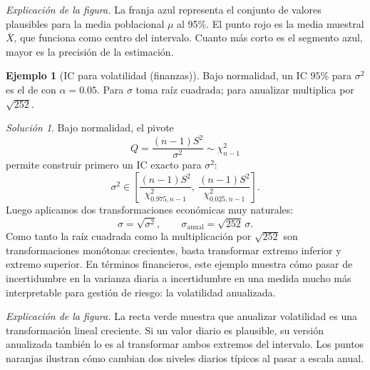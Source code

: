 \documentclass[11pt]{article}
\theoremstyle{plain}
\theoremstyle{definition}
\newtheorem{example}[theorem]{Ejemplo}
\theoremstyle{remark}
\theoremstyle{solstyle}
\newtheorem*{solution}{Solución}
\newcommand{\1}{\mathbbm{1}}
\begin{document}
\noindent\textit{Explicación de la figura.} La franja azul representa el conjunto de valores plausibles para la media poblacional $\mu$ al 95\%. El punto rojo es la media muestral $\overline X$, que funciona como centro del intervalo. Cuanto más corto es el segmento azul, mayor es la precisión de la estimación.

\begin{example}[IC para volatilidad (finanzas)]
Bajo normalidad, un IC $95\%$ para $\sigma^2$ es el de  con $\alpha=0.05$.
Para $\sigma$ toma raíz cuadrada; para anualizar multiplica por $\sqrt{252}$.
\end{example}

\begin{solution}
Bajo normalidad, el pivote
\[
Q=\frac{(n-1)S^2}{\sigma^2}\sim \chi^2_{n-1}
\]
permite construir primero un IC exacto para $\sigma^2$:
\[
\sigma^2\in \left[\frac{(n-1)S^2}{\chi^2_{0.975,n-1}},\ \frac{(n-1)S^2}{\chi^2_{0.025,n-1}}\right].
\]
Luego aplicamos dos transformaciones económicas muy naturales:
\[
\sigma=\sqrt{\sigma^2},
\qquad
\sigma_{\text{anual}}=\sqrt{252}\,\sigma.
\]
Como tanto la raíz cuadrada como la multiplicación por $\sqrt{252}$ son transformaciones monótonas crecientes, basta transformar extremo inferior y extremo superior. En términos financieros, este ejemplo muestra cómo pasar de incertidumbre en la varianza diaria a incertidumbre en una medida mucho más interpretable para gestión de riesgo: la volatilidad anualizada.
\end{solution}

\begin{center}
\end{center}

\noindent\textit{Explicación de la figura.} La recta verde muestra que anualizar volatilidad es una transformación lineal creciente. Si un valor diario es plausible, su versión anualizada también lo es al transformar ambos extremos del intervalo. Los puntos naranjas ilustran cómo cambian dos niveles diarios típicos al pasar a escala anual.
\end{document}
